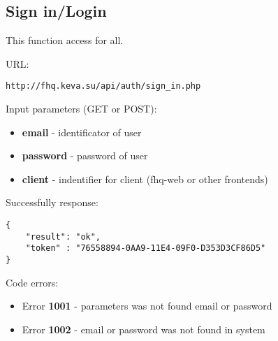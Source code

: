 \subsection{Sign in/Login}
\par

This function access for all.

URL:
\begin{Verbatim}[frame=single]
http://fhq.keva.su/api/auth/sign_in.php
\end{Verbatim}

Input parameters (GET or POST):
\begin{itemize}
  \item \textbf{email} - identificator of user
  \item \textbf{password} - password of user
  \item \textbf{client} - indentifier for client (fhq-web or other frontends)
\end{itemize}

Successfully response:  \\
\begin{Verbatim}[frame=single]
{
    "result": "ok",
    "token" : "76558894-0AA9-11E4-09F0-D353D3CF86D5"
}
\end{Verbatim}

Code errors:
\begin{itemize}
  \item {\color{red} Error \textbf{1001} - parameters was not found email or password}
  \item {\color{red} Error \textbf{1002} - email or password was not found in system}
\end{itemize}
